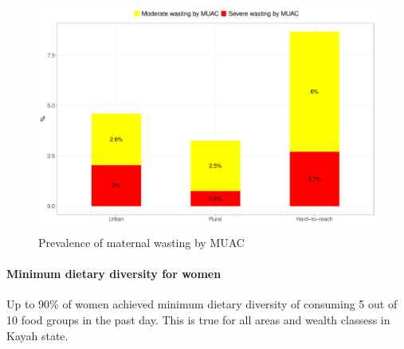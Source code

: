 \documentclass[12pt,a4paper]{article}
\let\oldparagraph\paragraph
\renewcommand{\paragraph}[1]{\oldparagraph{#1}\mbox{}}
\begin{document}
\begin{figure}[H]

{\centering \includegraphics{kayahReport_files/figure-latex/mMuacPlot-1} 

}

\caption{Prevalence of maternal wasting by MUAC}\label{fig:mMuacPlot}
\end{figure}

\hypertarget{mddw}{%
\paragraph{Minimum dietary diversity for women}\label{mddw}}

Up to 90\% of women achieved minimum dietary diversity of consuming 5 out of 10 food groups in the past day. This is true for all areas and wealth classess in Kayah state.
\end{document}
